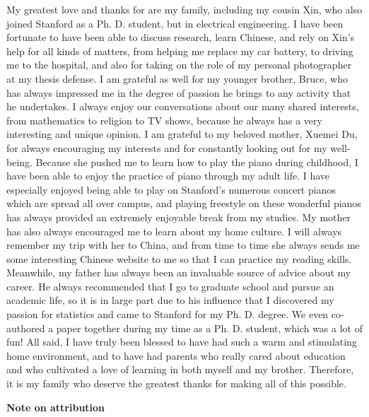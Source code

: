 \documentclass[12pt]{report}
\begin{document}
My greatest love and thanks for are my family, including my cousin
Xin, who also joined Stanford as a Ph. D. student, but in electrical
engineering.  I have been fortunate to have been able to discuss
research, learn Chinese, and rely on Xin's help for all kinds of
matters, from helping me replace my car battery, to driving me to the
hospital, and also for taking on the role of my personal photographer
at my thesis defense.  I am grateful as well for my younger brother,
Bruce, who has always impressed me in the degree of passion he brings
to any activity that he undertakes.  I always enjoy our conversations
about our many shared interests, from mathematics to religion to TV
shows, because he always has a very interesting and unique opinion. I
am grateful to my beloved mother, Xuemei Du, for always encouraging my
interests and for constantly looking out for my well-being.  Because
she pushed me to learn how to play the piano during childhood, I have
been able to enjoy the practice of piano through my adult life.  I
have especially enjoyed being able to play on Stanford's numerous
concert pianos which are spread all over campus, and playing freestyle
on these wonderful pianos has always provided an extremely enjoyable
break from my studies.  My mother has also always encouraged me to
learn about my home culture.  I will always remember my trip with her
to China, and from time to time she always sends me some interesting
Chinese website to me so that I can practice my reading skills.
Meanwhile, my father has always been an invaluable source of advice
about my career.  He always recommended that I go to graduate school
and pursue an academic life, so it is in large part due to his
influence that I discovered my passion for statistics and came to
Stanford for my Ph. D. degree.  We even co-authored a paper together
during my time as a Ph. D. student, which was a lot of fun!  All said,
I have truly been blessed to have had such a warm and stimulating home
environment, and to have had parents who really cared about education
and who cultivated a love of learning in both myself and my brother.
Therefore, it is my family who deserve the greatest thanks for making
all of this possible.
\newline



\noindent\textbf{Note on attribution}
\end{document}
